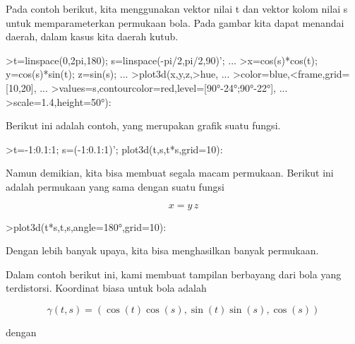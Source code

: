 \documentclass[12pt,Times new roman,letterpaper]{book}
\begin{document}
\begin{eulernootebook}
\begin{eulercomment}
\begin{eulercomment}
\begin{eulernootebook}
\begin{eulercomment}
\begin{eulercomment}
\begin{eulercomment}
\begin{eulercomment}
\begin{eulercomment}
\begin{eulercomment}
\begin{eulercomment}
\begin{eulernotebook}
\begin{eulercomment}
Pada contoh berikut, kita menggunakan vektor nilai t dan vektor kolom
nilai s untuk memparameterkan permukaan bola. Pada gambar kita dapat
menandai daerah, dalam kasus kita daerah kutub.
\end{eulercomment}
\begin{eulerprompt}
>t=linspace(0,2pi,180); s=linspace(-pi/2,pi/2,90)'; ...
>x=cos(s)*cos(t); y=cos(s)*sin(t); z=sin(s); ...
>plot3d(x,y,z,>hue, ...
>color=blue,<frame,grid=[10,20], ...
>values=s,contourcolor=red,level=[90°-24°;90°-22°], ...
>scale=1.4,height=50°):
\end{eulerprompt}
\begin{eulercomment}
Berikut ini adalah contoh, yang merupakan grafik suatu fungsi.
\end{eulercomment}
\begin{eulerprompt}
>t=-1:0.1:1; s=(-1:0.1:1)'; plot3d(t,s,t*s,grid=10):
\end{eulerprompt}
\begin{eulercomment}
Namun demikian, kita bisa membuat segala macam permukaan. Berikut ini
adalah permukaan yang sama dengan suatu fungsi

\end{eulercomment}
\begin{eulerformula}
\[
x = y \, z
\]
\end{eulerformula}
\begin{eulerprompt}
>plot3d(t*s,t,s,angle=180°,grid=10):
\end{eulerprompt}
\begin{eulercomment}
Dengan lebih banyak upaya, kita bisa menghasilkan banyak permukaan.

Dalam contoh berikut ini, kami membuat tampilan berbayang dari bola
yang terdistorsi. Koordinat biasa untuk bola adalah

\end{eulercomment}
\begin{eulerformula}
\[
\gamma(t,s) = (\cos(t)\cos(s),\sin(t)\sin(s),\cos(s))
\]
\end{eulerformula}
\begin{eulercomment}
dengan


\end{eulercomment}
\end{eulernotebook}
\end{eulercomment}
\end{eulercomment}
\end{eulercomment}
\end{eulercomment}
\end{eulercomment}
\end{eulercomment}
\end{eulercomment}
\end{eulernootebook}
\end{eulercomment}
\end{eulercomment}
\end{eulernootebook}
\end{document}

